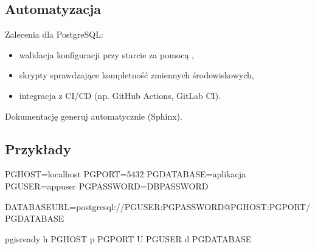 \documentclass[letterpaper,10pt,english]{sphinxmanual}
\begin{document}
\subsection{Automatyzacja}
\label{\detokenize{rozdzial_2/rozdzial_22/index:automatyzacja}}
\sphinxAtStartPar
Zalecenia dla PostgreSQL:
\begin{itemize}
\item {} 
\sphinxAtStartPar
walidacja konfiguracji przy starcie za pomocą ,

\item {} 
\sphinxAtStartPar
skrypty sprawdzające kompletność zmiennych środowiskowych,

\item {} 
\sphinxAtStartPar
integracja z CI/CD (np. GitHub Actions, GitLab CI).

\end{itemize}

\sphinxAtStartPar
Dokumentację generuj automatycznie (Sphinx).


\subsection{Przykłady}
\label{\detokenize{rozdzial_2/rozdzial_22/index:przyklady}}
\sphinxAtStartPar
{}

\begin{sphinxVerbatim}[commandchars=\\\{\}]
PGHOST=localhost
PGPORT=5432
PGDATABASE=aplikacja
PGUSER=app\PYGZus{}user
PGPASSWORD=\PYGZdl{}\PYGZob{}DB\PYGZus{}PASSWORD\PYGZcb{}
\end{sphinxVerbatim}

\sphinxAtStartPar
{}

\begin{sphinxVerbatim}[commandchars=\\\{\}]
DATABASE\PYGZus{}URL=postgresql://\PYGZdl{}\PYGZob{}PGUSER\PYGZcb{}:\PYGZdl{}\PYGZob{}PGPASSWORD\PYGZcb{}@\PYGZdl{}\PYGZob{}PGHOST\PYGZcb{}:\PYGZdl{}\PYGZob{}PGPORT\PYGZcb{}/\PYGZdl{}\PYGZob{}PGDATABASE\PYGZcb{}
\end{sphinxVerbatim}

\sphinxAtStartPar
{}

\begin{sphinxVerbatim}[commandchars=\\\{\}]
pg\PYGZus{}isready \PYGZhy{}h \PYGZdl{}\PYGZob{}PGHOST\PYGZcb{} \PYGZhy{}p \PYGZdl{}\PYGZob{}PGPORT\PYGZcb{} \PYGZhy{}U \PYGZdl{}\PYGZob{}PGUSER\PYGZcb{} \PYGZhy{}d \PYGZdl{}\PYGZob{}PGDATABASE\PYGZcb{}
\end{sphinxVerbatim}
\end{document}
